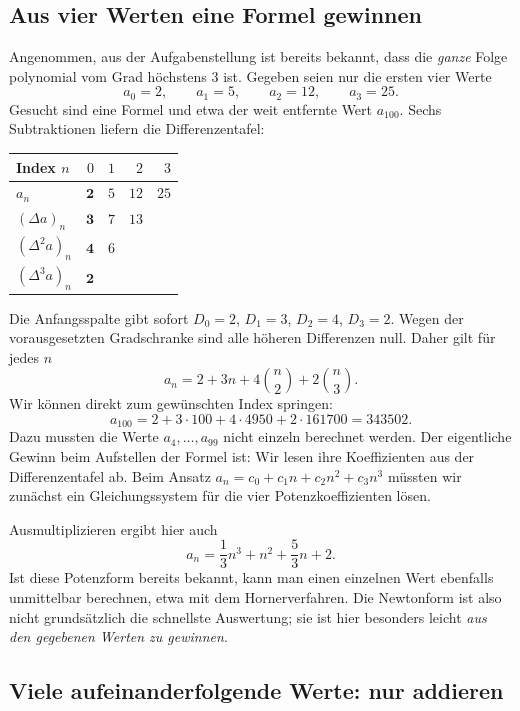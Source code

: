 \subsection*{Aus vier Werten eine Formel gewinnen}

Angenommen, aus der Aufgabenstellung ist bereits bekannt, dass die
\emph{ganze} Folge polynomial vom Grad höchstens $3$ ist. Gegeben seien
nur die ersten vier Werte
\[
 a_0=2,\qquad a_1=5,\qquad a_2=12,\qquad a_3=25.
\]
Gesucht sind eine Formel und etwa der weit entfernte Wert $a_{100}$.
Sechs Subtraktionen liefern die Differenzentafel:
\begin{center}
\begin{tabular}{@{}lrrrr@{}}
\toprule
Index $n$ & $0$ & $1$ & $2$ & $3$\\
\midrule
$a_n$            & $\mathbf2$ & $5$ & $12$ & $25$\\
$(\Delta a)_n$   & $\mathbf3$ & $7$ & $13$ &\\
$(\Delta^2a)_n$  & $\mathbf4$ & $6$ & &\\
$(\Delta^3a)_n$  & $\mathbf2$ & & &\\
\bottomrule
\end{tabular}
\end{center}
Die Anfangsspalte gibt sofort $D_0=2$, $D_1=3$, $D_2=4$, $D_3=2$.
Wegen der vorausgesetzten Gradschranke sind alle höheren Differenzen
null. Daher gilt für jedes $n$
\[
 \boxed{\displaystyle a_n=2+3n+4\binom n2+2\binom n3.}
\]
Wir können direkt zum gewünschten Index springen:
\[
 a_{100}=2+3\cdot100+4\cdot4950+2\cdot161700=343502.
\]
Dazu mussten die Werte $a_4,\ldots,a_{99}$ nicht einzeln berechnet
werden. Der eigentliche Gewinn beim Aufstellen der Formel ist:
Wir lesen ihre Koeffizienten aus der Differenzentafel ab. Beim Ansatz
$a_n=c_0+c_1n+c_2n^2+c_3n^3$ müssten wir zunächst ein Gleichungssystem
für die vier Potenzkoeffizienten lösen.

Ausmultiplizieren ergibt hier auch
\[
 a_n=\frac13n^3+n^2+\frac53n+2.
\]
Ist diese Potenzform bereits bekannt, kann man einen einzelnen Wert
ebenfalls unmittelbar berechnen, etwa mit dem Hornerverfahren.
Die Newtonform ist also nicht grundsätzlich die schnellste Auswertung;
sie ist hier besonders leicht \emph{aus den gegebenen Werten zu gewinnen}.

\subsection*{Viele aufeinanderfolgende Werte: nur addieren}

